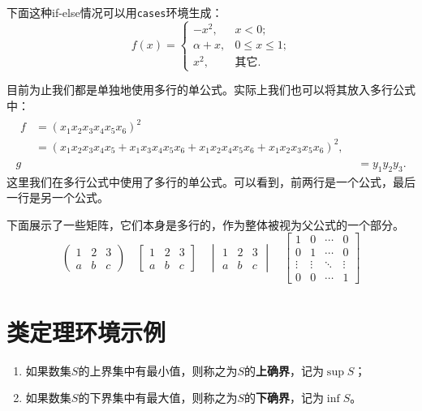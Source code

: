 \documentclass[zihao = -4, linespread = 1.5]{ctexart}
\begin{document}
下面这种if-else情况可以用\texttt{cases}环境生成：
\begin{equation}
  f(x)
    = \begin{cases}
    -x^{2},            &\text{$x < 0$;}\\
    \alpha + x,     &\text{$0 \leq x \leq 1$;}\\
    x^{2},             &\text{其它.}
    \end{cases}
\end{equation}


目前为止我们都是单独地使用多行的单公式。实际上我们也可以将其放入多行公式中： %
\begin{align} %
\begin{split}
f &= (x_{1} x_{2} x_{3} x_{4} x_{5} x_{6})^{2}\\
&= (x_{1} x_{2} x_{3} x_{4} x_{5} + x_{1} x_{3} x_{4} x_{5} x_{6} + x_{1} x_{2} x_{4} x_{5} x_{6} + x_{1} x_{2} x_{3} x_{5} x_{6})^{2}, \end{split}\\
g &= y_{1} y_{2} y_{3}.
\end{align}
这里我们在多行公式中使用了多行的单公式。可以看到，前两行是一个公式，最后一行是另一个公式。

下面展示了一些矩阵，它们本身是多行的，作为整体被视为父公式的一个部分。
\[
\begin{pmatrix}
1 & 2 & 3\\
a & b & c
\end{pmatrix}
\quad
\begin{bmatrix}
1 & 2 & 3\\
a & b & c
\end{bmatrix}
\quad
\begin{vmatrix}
1 & 2 & 3\\
a & b & c
\end{vmatrix}
\quad
\begin{bmatrix}
1 & 0 & \cdots & 0 \\
 0 & 1 & \cdots & 0 \\
 \vdots & \vdots & \ddots & \vdots \\
 0 & 0 & \cdots & 1
 \end{bmatrix}
\]

\section{类定理环境示例}
\begin{definition}[上确界与下确界]\label{def:supremum}
\leavevmode %
\begin{enumerate}[label=(\arabic*),leftmargin=2\parindent]
  \item 如果数集$S$的上界集中有最小值，则称之为$S$的\textbf{上确界}，记为$\sup S$；
  \item 如果数集$S$的下界集中有最大值，则称之为$S$的\textbf{下确界}，记为$\inf S$。
\end{enumerate}
\end{definition}
\end{document}
